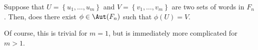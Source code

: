 \documentclass[12pt]{article}
\begin{document}
\begin{problem}\label{prob:Automorphisms_on_sets_of_n_words}
    Suppose that $U = \left\{u_1, \ldots, u_m\right\}$ and $V = \left\{v_1, \ldots, v_m\right\}$ are two sets of words in $F_n$. Then, does there exist $\phi \in \Aut(F_n)$ such that $\phi(U) = V$.
\end{problem}

Of course, this is trivial for $m = 1$, but is immediately more complicated for $m > 1$.

%
%
%
%
\end{document}
